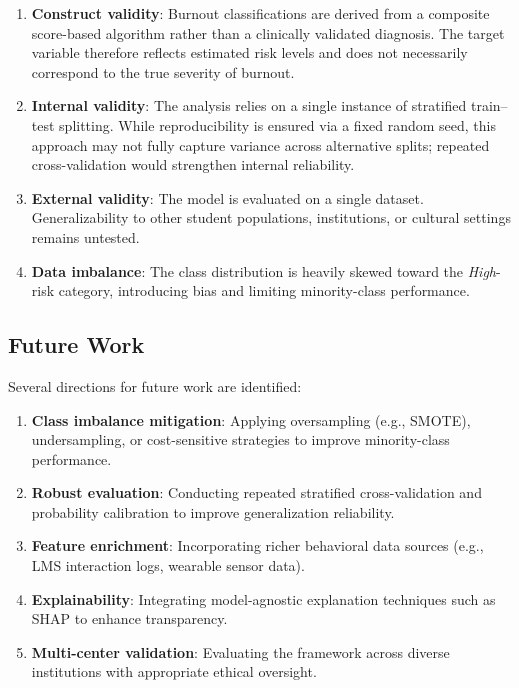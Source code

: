\documentclass[conference]{IEEEtran}
\begin{document}
\begin{enumerate}[leftmargin=*]
    \item \textbf{Construct validity}: Burnout classifications are derived from a composite score-based algorithm rather than a clinically validated diagnosis. The target variable therefore reflects estimated risk levels and does not necessarily correspond to the true severity of burnout.

    \item \textbf{Internal validity}: The analysis relies on a single instance of stratified train--test splitting. While reproducibility is ensured via a fixed random seed, this approach may not fully capture variance across alternative splits; repeated cross-validation would strengthen internal reliability.

    \item \textbf{External validity}: The model is evaluated on a single dataset. Generalizability to other student populations, institutions, or cultural settings remains untested.

    \item \textbf{Data imbalance}: The class distribution is heavily skewed toward the \textit{High}-risk category, introducing bias and limiting minority-class performance.
\end{enumerate}

\subsection{Future Work}

Several directions for future work are identified:
\begin{enumerate}[leftmargin=*]
    \item \textbf{Class imbalance mitigation}: Applying oversampling (e.g., SMOTE), undersampling, or cost-sensitive strategies to improve minority-class performance.
    \item \textbf{Robust evaluation}: Conducting repeated stratified cross-validation and probability calibration to improve generalization reliability.
    \item \textbf{Feature enrichment}: Incorporating richer behavioral data sources (e.g., LMS interaction logs, wearable sensor data).
    \item \textbf{Explainability}: Integrating model-agnostic explanation techniques such as SHAP to enhance transparency.
    \item \textbf{Multi-center validation}: Evaluating the framework across diverse institutions with appropriate ethical oversight.
\end{enumerate}
\end{document}

